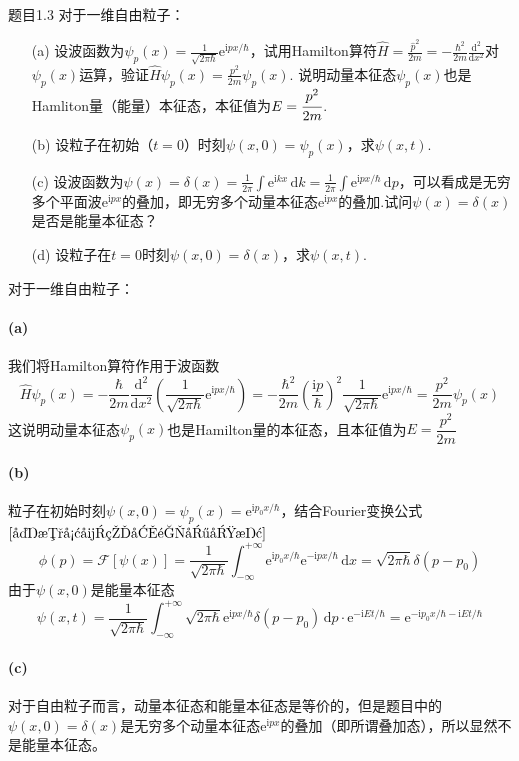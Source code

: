 \begin{question}{题目1.3}
    对于一维自由粒子：
    \begin{enumerate}
        \item[(a)] 设波函数为$\displaystyle \psi_p(x)=\frac{1}{\sqrt{2\pi\hbar}}\mathrm{e}^{\mathrm{i}px/\hbar}$，试用Hamilton算符$\displaystyle \hat{H}=\frac{\hat{p}^2}{2m}=-\frac{\hbar^2}{2m}\frac{\mathrm{d}^2}{\mathrm{d}x^2}$对$\psi_p(x)$运算，验证$\displaystyle \hat{H}\psi_p(x)=\frac{p^2}{2m}\psi_p(x)$. 说明动量本征态$\psi_p(x)$也是Hamliton量（能量）本征态，本征值为$\displaystyle E=\cfrac{p^2}{2m}$.
        \item[(b)] 设粒子在初始（$t=0$）时刻$\psi(x,0)=\psi_p(x)$，求$\psi(x,t)$.
        \item[(c)] 设波函数为$\displaystyle \psi(x)=\delta(x)=\frac{1}{2\pi}\int\mathrm{e}^{\mathrm{i}kx}\,\mathrm{d}k=\frac{1}{2\pi}\int\mathrm{e}^{\mathrm{i}px/\hbar}\,\mathrm{d}p$，可以看成是无穷多个平面波$\mathrm{e}^{\mathrm{i}px}$的叠加，即无穷多个动量本征态$\mathrm{e}^{\mathrm{i}px}$的叠加.试问$\psi(x)=\delta(x)$是否是能量本征态？
        \item[(d)] 设粒子在$t=0$时刻$\psi(x,0)=\delta(x)$，求$\psi(x,t)$.
    \end{enumerate}
\end{question}
\begin{solution}
    对于一维自由粒子：
    \paragraph{(a)} 我们将Hamilton算符作用于波函数
    $$
        \hat{H}\psi_p(x)
        =-\frac{\hbar}{2m}\frac{\mathrm{d}^2}{\mathrm{d}x^2}\left(\frac{1}{\sqrt{2\pi\hbar}}\mathrm{e}^{\mathrm{i}px/\hbar}\right)
        =-\frac{\hbar^2}{2m}\left(\frac{\mathrm{i}p}{\hbar}\right)^2 \frac{1}{\sqrt{2\pi\hbar}}\mathrm{e}^{\mathrm{i}px/\hbar}
        =\frac{p^2}{2m}\psi_p(x)
    $$
    这说明动量本征态$\psi_p(x)$也是Hamilton量的本征态，且本征值为$E=\dfrac{p^2}{2m}$

    \paragraph{(b)}粒子在初始时刻$\psi(x,0) = \psi_p(x) = \mathrm{e}^{\mathrm{i}p_0x/\hbar}$，结合Fourier变换公式$\eqref{复数形式的傅里叶变换}$
    $$
        \phi(p)=\mathcal{F}[\psi(x)]
        =\frac{1}{\sqrt{2\pi\hbar}}\int_{-\infty}^{+\infty}\mathrm{e}^{\mathrm{i}p_0x/\hbar}\mathrm{e}^{-\mathrm{i}px/\hbar}\,\mathrm{d}x
        =\sqrt{2\pi\hbar}\delta(p-p_0)
    $$
    由于$\psi(x,0)$是能量本征态
    $$
        \psi(x, t) = \frac{1}{\sqrt{2\pi\hbar}}\int_{-\infty}^{+\infty}\sqrt{2\pi\hbar}\mathrm{e}^{\mathrm{i}px/\hbar}\delta(p-p_0)\,\mathrm{d}p\cdot\mathrm{e}^{-\mathrm{i}Et/\hbar}
        =\mathrm{e}^{-\mathrm{i}p_0x/\hbar-\mathrm{i}Et/\hbar}
    $$

    \paragraph{(c)} 对于自由粒子而言，动量本征态和能量本征态是等价的，但是题目中的$\psi(x, 0)=\delta(x)$是无穷多个动量本征态$\mathrm{e}^{\mathrm{i}px}$的叠加（即所谓叠加态），所以显然不是能量本征态。
\end{solution}

